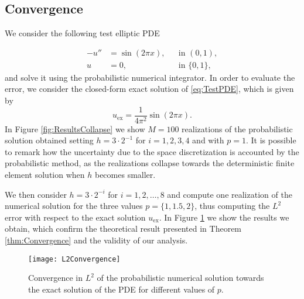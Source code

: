 \documentclass{siamart1116}
\numberwithin{theorem}{section}
\begin{document}
\subsection{Convergence} We consider the following test elliptic PDE

\begin{equation}\label{eq:TestPDE}
\begin{aligned}
	-u'' &= \sin(2\pi x), && \text{in } (0, 1),\\
	u &= 0, && \text{in } \{0, 1\},
\end{aligned}
\end{equation}	
and solve it using the probabilistic numerical integrator. In order to evaluate the error, we consider the closed-form exact solution of \eqref{eq:TestPDE}, which is given by
\begin{equation}
	u_{\mathrm{ex}} = \frac{1}{4\pi^2} \sin(2 \pi x).
\end{equation}
In Figure \ref{fig:ResultsCollapse} we show $M = 100$ realizations of the probabilistic solution obtained setting $h = 3 \cdot 2^{-1}$ for $i = 1, 2, 3, 4$ and with $p = 1$. It is possible to remark how the uncertainty due to the space discretization is accounted by the probabilistic method, as the realizations collapse towards the deterministic finite element solution when $h$ becomes smaller.

We then consider $h = 3 \cdot 2^{-i}$ for $i = 1, 2, \ldots, 8$ and compute one realization of the numerical solution for the three values $p = \{1, 1.5, 2\}$, thus computing the $L^2$ error with respect to the exact solution $u_{\mathrm{ex}}$. In Figure \ref{fig:ResultsConvergence} we show the results we obtain, which confirm the theoretical result presented in Theorem \ref{thm:Convergence} and the validity of our analysis.

\begin{figure}[t]
	\centering
	\texttt{[image: L2Convergence]}
	\caption{Convergence in $L^2$ of the probabilistic numerical solution towards the exact solution of the PDE for different values of $p$.}
	\label{fig:ResultsConvergence}
\end{figure}
\end{document}
